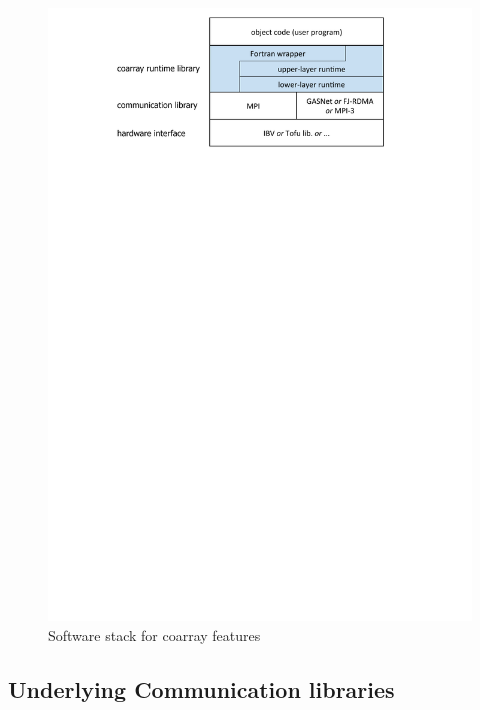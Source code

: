 \begin{figure}[tbh]
  \begin{center}
    \mbox{\includegraphics[trim=27mm 208mm 29mm 0mm, scale=0.7,clip]{figs/softstack-r4.pdf}}
    \caption{Software stack for coarray features}\label{fig:layer}
  \end{center}
\end{figure}


\subsection{Underlying Communication libraries}

